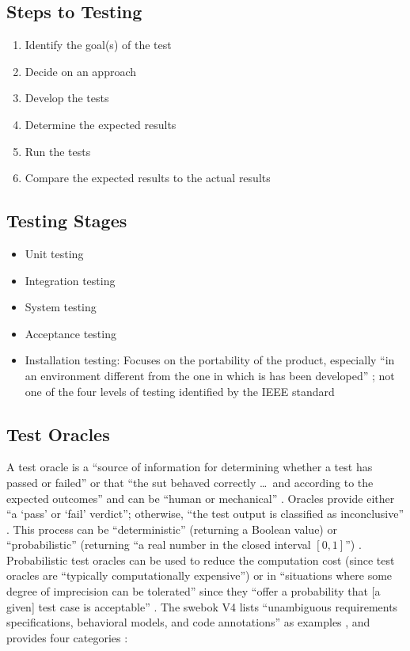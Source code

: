 \subsection[Steps to Testing]{Steps to Testing
    \citep[p.~443]{PetersAndPedrycz2000}}
\begin{enumerate}
    \item Identify the goal(s) of the test
    \item Decide on an approach
    \item Develop the tests
    \item Determine the expected results
    \item Run the tests
    \item Compare the expected results to the actual results
\end{enumerate}

\subsection{Testing Stages}
\begin{itemize}
    \item Unit testing
    \item Integration testing
    \item System testing
    \item Acceptance testing
    \item Installation testing: Focuses on the portability of the product,
          especially ``in an environment different from the one in which is
          has been developed'' \citep[p.~439]{vanVliet2000}; not
          one of the four levels of testing identified by the IEEE standard
          \citep[p.~445]{PetersAndPedrycz2000}
\end{itemize}

\subsection{Test Oracles}
A test oracle is a ``source of information for determining whether a test has
passed or failed'' \citep[p.~13]{IEEE2022} or that ``the \acs{sut} behaved
correctly \dots\ and according to the expected outcomes'' and can be ``human or
mechanical'' \citep[p.~5-5]{SWEBOK2024}. Oracles provide either ``a
`pass' or `fail' verdict''; otherwise, ``the test output is classified as
inconclusive'' \citep[p.~5-5]{SWEBOK2024}. This process can be ``deterministic''
(returning a Boolean value) or ``probabilistic'' (returning ``a real number in
the closed interval $[0, 1]$'') \citep[p.~509]{BarrEtAl2015}. Probabilistic
test oracles can be used to reduce the computation cost (since test oracles
are ``typically computationally expensive'') \citep[p.~509]{BarrEtAl2015}
or in ``situations where some degree of imprecision can be tolerated'' since
they ``offer a probability that [a given] test case is acceptable''
\citep[p.~510]{BarrEtAl2015}. The \acs{swebok} V4 lists ``unambiguous requirements
specifications, behavioral models, and code annotations'' as examples
\citep[p.~5-5]{SWEBOK2024}, and \citeauthor{BarrEtAl2015} provides four
categories \citeyearpar[p.~510]{BarrEtAl2015}:

